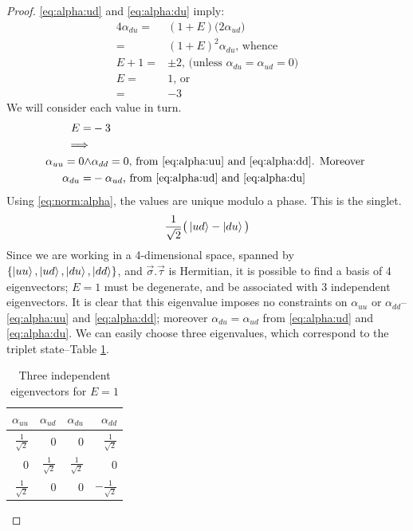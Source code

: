 \documentclass[]{article}
\begin{document}
\begin{proof}
   \eqref{eq:alpha:ud} and \eqref{eq:alpha:du} imply:
   \begin{align*}
   	4 \alpha_{du} =& (1+E)\big(2\alpha_{ud}\big)\\
   	=& (1+E)^2 \alpha_{du} \text{, whence}\\
   	E+1 =& \pm 2 \text{, (unless $\alpha_{du}=\alpha_{ud}=0$)}\\
   	E =& 1 \text{, or}\\
   	 =& -3
   \end{align*}
	We will consider each value in turn.
	\begin{align}
		E =& -3\\
		\implies &\\
		\alpha_{uu} =0 \land& \alpha_{dd}= 0 \text{, from \eqref{eq:alpha:uu} and \eqref{eq:alpha:dd}. Moreover }\\
		\alpha_{du} =& - \alpha_{ud} \text{, from \eqref{eq:alpha:ud} and \eqref{eq:alpha:du}}
	\end{align}
	Using \eqref{eq:norm:alpha}, the values are unique modulo a phase. This is the singlet.
	\begin{align*}
		\frac{1}{\sqrt{2}}\big(\ket{ud}-\ket{du}\big)
	\end{align*}
	Since we are working in a 4-dimensional space, spanned by $\{\ket{uu}, \ket{ud}, \ket{du}, \ket{dd}\}$, and $\vec{\sigma}.\vec{\tau}$ is Hermitian, it is possible to find a basis of 4 eigenvectors; $E=1$ must be degenerate, and be associated with 3 independent eigenvectors.
	It is clear that this eigenvalue imposes no constraints on $\alpha_{uu}$ or $\alpha_{dd}$-- \eqref{eq:alpha:uu} and \eqref{eq:alpha:dd}; moreover $\alpha_{du} = \alpha_{ud}$  from \eqref{eq:alpha:ud} and \eqref{eq:alpha:du}. We can easily choose three eigenvalues, which correspond to the triplet state--Table \ref{eq:basis3}.
	\begin{table}[H]
		\caption{Three independent eigenvectors for $E=1$}\label{eq:basis3}
		\begin{center}
			\begin{tabular}{|r|r|r|r|}\hline
			$\alpha_{uu}$& $\alpha_{ud}$&$\alpha_{du}$&$\alpha_{dd}$\\ \hline
			$\frac{1}{\sqrt{2}}$&0&0&$\frac{1}{\sqrt{2}}$\\ \hline
			0&$\frac{1}{\sqrt{2}}$&$\frac{1}{\sqrt{2}}$&0\\ \hline
			$\frac{1}{\sqrt{2}}$&0&0&$-\frac{1}{\sqrt{2}}$\\ \hline
		\end{tabular}
		\end{center}
	\end{table}

\end{proof}
\end{document}

